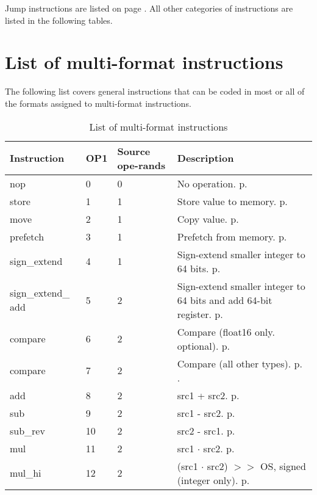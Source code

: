 \documentclass[forwardcom.tex]{subfiles}
\begin{document}
Jump instructions are listed on page \pageref{table:controlTransferInstructions}. All other categories of instructions are listed in the following tables.


\section{List of multi-format instructions}
The following list covers general instructions that can be coded in most or all of the formats
assigned to multi-format instructions.

\begin{longtable} {|p{25mm}|p{12mm}|p{12mm}|p{100mm}|}
\caption{
List of multi-format instructions} 
\label{table:ListOfMultiFormatInstructions} \\
\endfirsthead
\endhead
\hline
\bfseries Instruction & \bfseries OP1 & \bfseries Source ope-rands & \bfseries Description \\
\hline
nop          &  0 & 0 & No operation. p. \pageref{table:nopInstruction}\\
store        &  1 & 1 & Store value to memory. p. \pageref{table:storeInstruction}\\
move         &  2 & 1 & Copy value. p. \pageref{table:moveInstruction}\\
prefetch     &  3 & 1 & Prefetch from memory. p. \pageref{table:prefetchInstruction} \\
sign\_extend &  4 & 1 & Sign-extend smaller integer to 64 bits. p. \pageref{table:signExtendInstruction}\\
sign\_extend\_ add & 5 & 2 & Sign-extend smaller integer to 64 bits and add 64-bit register. p. \pageref{table:signExtendAddInstruction} \\
compare      &  6 & 2 & Compare (float16 only. optional). p. \pageref{table:compareInstruction} \\
compare      &  7 & 2 & Compare (all other types). p. \pageref{table:compareInstruction}. \\
add          &  8 & 2 & src1 + src2. p. \pageref{table:addInstruction} \\
sub          &  9 & 2 & src1 - src2. p. \pageref{table:subInstruction}\\
sub\_rev     & 10 & 2 & src2 - src1. p. \pageref{table:subRevInstruction}\\
mul          & 11 & 2 & src1 $\cdot$ src2. p. \pageref{table:mulInstruction}\\ 
mul\_hi      & 12 & 2 & (src1 $\cdot$ src2) $>>$ OS, signed (integer only). p. \pageref{table:mulHiInstruction}\\

\end{longtable}
\end{document}
